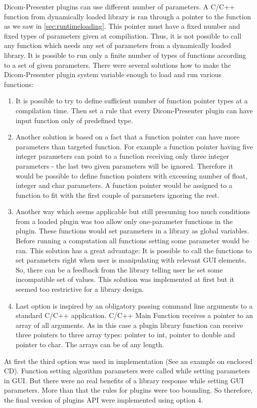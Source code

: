 Dicom-Presenter plugins can use different number of parameters. A C/C++ function from dynamically loaded library is ran through a pointer to the function as we saw in \ref{sec:runtimeloading}. This pointer must have a fixed number and fixed types of parameters given at compiliation. Thus, it is not possible to call any function which needs any set of parameters from a dynamically loaded library. It is possible to run only a finite number of types of functions according to a set of given parameters. There were several solutions how to make the Dicom-Presenter plugin system variable enough to load and run various functions:

\begin{enumerate}
\item It is possible to try to define sufficient number of function pointer types at a compilation time. Then set a rule that every Dicom-Presenter plugin can have input function only of predefined type.
\item Another solution is based on a fact that a function pointer can have more parameters than targeted function. For example a function pointer having five integer parameters can point to a function receiving only three integer parameters - the last two given parameters will be ignored. Therefore it would be possible to define function pointers with excessing number of float, integer and char parameters. A function pointer would be assigned to a function to fit with the first couple of parameters ignoring the rest.
\item Another way which seems applicable but still presuming too much conditions from a loaded plugin was too allow only one-parameter functions in the plugin. These functions would set parameters in a library as global variables. Before running a computation all functions setting some parameter would be ran. This solution has a great advantage: It is possible to call the functions to set parameters right when user is manipulating with relevant GUI elements. So, there can be a feedback from the library telling user he set some incompatible set of values. This solution was implemented at first but it seemed too restrictive for a library design. 
\item Last option is inspired by an obligatory passing command line arguments to a standard C/C++ application. C/C++ Main Function receives a pointer to an array of all arguments. As in this case a plugin library function can receive three pointers to three array types: pointer to int, pointer to double and pointer to char. The arrays can be of any length.
\end{enumerate}

At first the third option was used in implementation (See an example on encloced CD). Function setting algorithm parameters were called while setting parameters in GUI. But there were no real benefits of a library response while setting GUI parameters. More than that the rules for plugins were too bounding. So therefore, the final version of plugins API were implemented using option 4.
